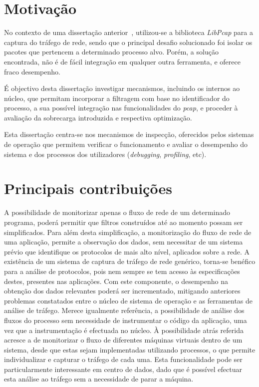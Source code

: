 \section{Motivação}
\label{sub:intro_motivation}

No contexto de uma dissertação anterior~\cite{Farruca:2009}, utilizou-se a biblioteca \textit{LibPcap} para a captura do tráfego de rede, sendo que o principal desafio solucionado foi isolar os pacotes que pertencem a determinado processo alvo.
Porém, a solução encontrada, não é de fácil integração em qualquer outra ferramenta, e oferece fraco desempenho.

É objectivo desta dissertação investigar mecanismos, incluindo os internos ao núcleo, que permitam incorporar a filtragem com base no identificador do processo, a sua possível integração nas funcionalidades do \textit{pcap}, e proceder à avaliação da sobrecarga introduzida e respectiva optimização.

Esta dissertação centra-se nos mecanismos de inspecção, oferecidos pelos sistemas de operação que permitem verificar o funcionamento e avaliar o desempenho do sistema e dos processos dos utilizadores (\textit{debugging}, \textit{profiling}, etc).

\section{Principais contribuições} 
\label{sec:intro_contribuicoes}

A possibilidade de monitorizar apenas o fluxo de rede de um determinado programa, poderá permitir que filtros construídos até ao momento possam ser simplificados.
Para além desta simplificação, a monitorização do fluxo de rede de uma aplicação, permite a observação dos dados, sem necessitar de um sistema prévio que identifique os protocolos de mais alto nível, aplicados sobre a rede.
A existência de um sistema de captura de tráfego de rede genérico, torna-se benéfico para a análise de protocolos, pois nem sempre se tem acesso às especificações destes, presentes nas aplicações.
Com este componente, o desempenho na obtenção dos dados relevantes poderá ser incrementado, mitigando anteriores problemas constatados entre o núcleo de sistema de operação e as ferramentas de análise de tráfego.
Merece igualmente referência, a possibilidade de análise dos fluxos do processo sem necessidade de instrumentar o código da aplicação, uma vez que a instrumentação é efectuada no núcleo.
À possibilidade atrás referida acresce a de monitorizar o fluxo de diferentes máquinas virtuais dentro de um sistema, desde que estas sejam implementadas utilizando processos, o que permite individualizar e capturar o tráfego de cada uma.
Esta funcionalidade pode ser particularmente interessante em centro de dados, dado que é possível efectuar esta análise ao tráfego sem a necessidade de parar a máquina.

